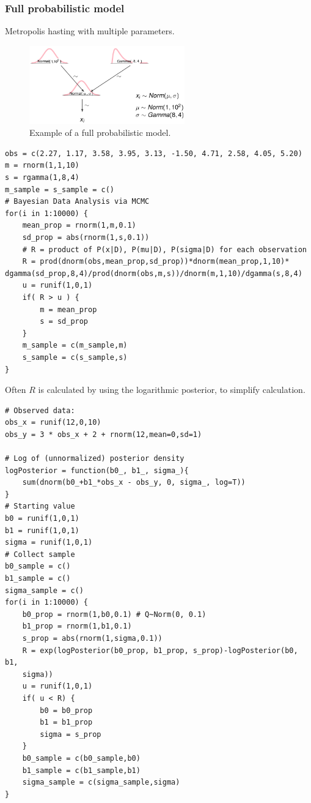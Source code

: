 \subsubsection{Full probabilistic model}
Metropolis hasting with multiple parameters.
\begin{figure}[H]
	\centering
	\includegraphics[width=0.6\textwidth]{images/full-probalistic-example.png}
	\caption{Example of a full probabilistic model.}
\end{figure}

\begin{lstlisting}
obs = c(2.27, 1.17, 3.58, 3.95, 3.13, -1.50, 4.71, 2.58, 4.05, 5.20)
m = rnorm(1,1,10)
s = rgamma(1,8,4)
m_sample = s_sample = c()
# Bayesian Data Analysis via MCMC
for(i in 1:10000) {
	mean_prop = rnorm(1,m,0.1)
	sd_prop = abs(rnorm(1,s,0.1))
	# R = product of P(x|D), P(mu|D), P(sigma|D) for each observation
	R = prod(dnorm(obs,mean_prop,sd_prop))*dnorm(mean_prop,1,10)* dgamma(sd_prop,8,4)/prod(dnorm(obs,m,s))/dnorm(m,1,10)/dgamma(s,8,4)
	u = runif(1,0,1)
	if( R > u ) {
		m = mean_prop
		s = sd_prop
	}
	m_sample = c(m_sample,m)
	s_sample = c(s_sample,s)
}
\end{lstlisting}

Often $R$ is calculated by using the logarithmic posterior, to simplify calculation.
\begin{lstlisting}
# Observed data:
obs_x = runif(12,0,10)
obs_y = 3 * obs_x + 2 + rnorm(12,mean=0,sd=1)

# Log of (unnormalized) posterior density
logPosterior = function(b0_, b1_, sigma_){
	sum(dnorm(b0_+b1_*obs_x - obs_y, 0, sigma_, log=T))
}
# Starting value
b0 = runif(1,0,1)
b1 = runif(1,0,1)
sigma = runif(1,0,1)
# Collect sample
b0_sample = c()
b1_sample = c()
sigma_sample = c()
for(i in 1:10000) {
	b0_prop = rnorm(1,b0,0.1) # Q~Norm(0, 0.1)
	b1_prop = rnorm(1,b1,0.1)
	s_prop = abs(rnorm(1,sigma,0.1))
	R = exp(logPosterior(b0_prop, b1_prop, s_prop)-logPosterior(b0, b1,
	sigma))
	u = runif(1,0,1)
	if( u < R) {
		b0 = b0_prop
		b1 = b1_prop
		sigma = s_prop
	}
	b0_sample = c(b0_sample,b0)
	b1_sample = c(b1_sample,b1)
	sigma_sample = c(sigma_sample,sigma)
}
\end{lstlisting}

